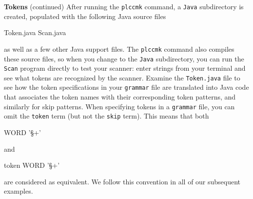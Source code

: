 \begin{minipage}[t]{\sw}
\slidenumber
\LARGE
{\bf Tokens} (continued)\exx
After running the \verb'plccmk' command,
a \verb'Java' subdirectory is created,
populated with the following Java source files
\Large
\begin{qv}
Token.java
Scan.java
\end{qv}
\LARGE
as well as a few other Java support files.
The \verb'plccmk' command also compiles these source files,
so when you change to the \verb'Java' subdirectory,
you can run the \verb'Scan' program directly to test your scanner:
enter strings from your terminal
and see what tokens are recognized by the scanner.\exx
Examine the \verb'Token.java' file to see
how the token specifications in your \verb'grammar' file are translated
into Java code that associates
the token names with their corresponding token patterns,
and similarly for skip patterns.\exx
When specifying tokens in a \verb'grammar' file,
you can omit the \verb'token' term (but not the \verb'skip' term).
This means that both
\Large
\begin{qv}
WORD '\S+'
\end{qv}
\LARGE
and
\Large
\begin{qv}
token WORD '\S+'
\end{qv}
\LARGE
are considered as equivalent.
We follow this convention in all of our subsequent examples.\exx
\end{minipage}
\clearpage

